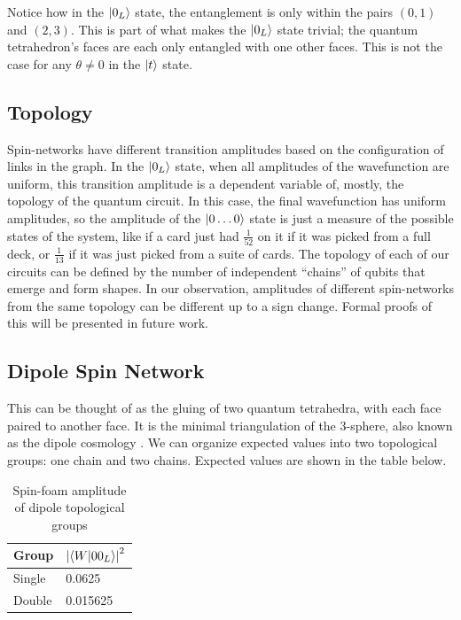\documentclass[a4paper,11pt,aps,tightenlines,nofootinbib]{revtex4}
\begin{document}
        Notice how in the $\ket{0_L}$ state, the entanglement is only within the pairs $(0,1)$ and $(2,3)$. This is part of what makes the $\ket{0_L}$ state trivial;
        the quantum tetrahedron's faces are each only entangled with one other faces. This is not the case for any $\theta\neq 0$ in the $\ket{t}$ state.

\subsection{Topology}
        Spin-networks have different transition amplitudes based on the configuration of links in the graph. In the $\ket{0_L}$ state, when all amplitudes of the wavefunction 
        are uniform, this transition amplitude is a dependent variable of, mostly, the topology of the quantum circuit. In this case, the final wavefunction  
        has uniform amplitudes, so the amplitude of the $\ket{0\dots0}$ state is just a measure of the possible states of the system, like if a card just had $\frac{1}{52}$ on it if it was 
        picked from a full deck, or $\frac{1}{13}$ if it was just picked from a suite of cards. The topology of each of our circuits can be defined by the number of independent ``chains'' 
        of qubits that emerge and form shapes. In our observation, amplitudes of different spin-networks from the same topology can be different up to a sign change. Formal proofs of this 
        will be presented in future work.

\subsection{Dipole Spin Network}
        This can be thought of as the gluing of two quantum tetrahedra, with each face paired to another face. It is the minimal triangulation of the 3-sphere, also known as the 
        dipole cosmology \cite{homogeneity-lqc}. We can organize expected values into two topological groups: one chain and two chains. Expected values are shown in the table below.
        \begin{table}[h]
        \begin{centering}
                \begin{tabular}{|l|l|}
                        \hline
                        Group & $ \abs{\bra{W}\ket{00_L}}^2$\\ \hline
                        Single & 0.0625 \\ \hline
                        Double & 0.015625 \\ \hline
                \end{tabular}
                \caption{Spin-foam amplitude of dipole topological groups}
        \end{centering}
        \end{table}
\end{document}

